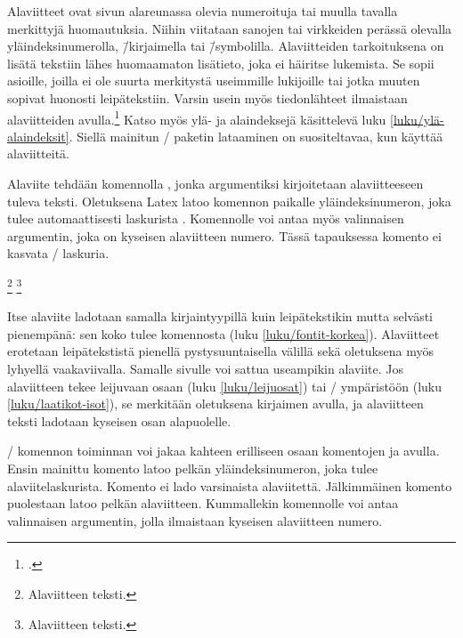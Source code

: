 Alaviitteet ovat sivun alareunassa olevia numeroituja tai muulla tavalla
merkittyjä huomautuksia. Niihin viitataan sanojen tai virkkeiden perässä
olevalla yläindeksinumerolla, \=/kirjaimella tai \=/symbolilla.
Alaviitteiden tarkoituksena on lisätä tekstiin lähes huomaamaton
lisätieto, joka ei häiritse lukemista. Se sopii asioille, joilla ei ole
suurta merkitystä useimmille lukijoille tai jotka muuten sopivat
huonosti leipätekstiin. Varsin usein myös tiedonlähteet ilmaistaan
alaviitteiden avulla.\footcites[162]{kt_oik}[127--128]{typokk} Katso
myös ylä- ja alaindeksejä käsittelevä luku \ref{luku/ylä-alaindeksit}.
Siellä mainitun \-/ paketin lataaminen on
suositeltavaa, kun käyttää alaviitteitä.

Alaviite tehdään komennolla , jonka argumentiksi
kirjoitetaan alaviitteeseen tuleva teksti. Oletuksena Latex latoo
komennon paikalle yläindeksinumeron, joka tulee automaattisesti
laskurista . Komennolle voi antaa myös valinnaisen
argumentin, joka on kyseisen alaviitteen numero. Tässä tapauksessa
komento ei kasvata \-/ laskuria.

\begin{koodilohkosis}
\footnote{Alaviitteen teksti.}
\footnote[numero]{Alaviitteen teksti.}
\end{koodilohkosis}

\noindent
Itse alaviite ladotaan samalla kirjaintyypillä kuin leipätekstikin mutta
selvästi pienempänä: sen koko tulee komennosta 
(luku \ref{luku/fontit-korkea}). Alaviitteet erotetaan leipätekstistä
pienellä pystysuuntaisella välillä sekä oletuksena myös lyhyellä
vaakaviivalla. Samalle sivulle voi sattua useampikin alaviite. Jos
alaviitteen tekee leijuvaan osaan (luku \ref{luku/leijuosat}) tai
\-/ ympäristöön (luku \ref{luku/laatikot-isot}), se
merkitään oletuksena kirjaimen avulla, ja alaviitteen teksti ladotaan
kyseisen osan alapuolelle.

\-/ komennon toiminnan voi jakaa kahteen erilliseen
osaan komentojen  ja 
avulla. Ensin mainittu komento latoo pelkän yläindeksinumeron, joka
tulee alaviitelaskurista. Komento ei lado varsinaista alaviitettä.
Jälkimmäinen komento puolestaan latoo pelkän alaviitteen. Kummallekin
komennolle voi antaa valinnaisen argumentin, jolla ilmaistaan kyseisen
alaviitteen numero.

\begin{koodilohkosis}
\footnotemark[numero]                      %
\end{koodilohkosis}

